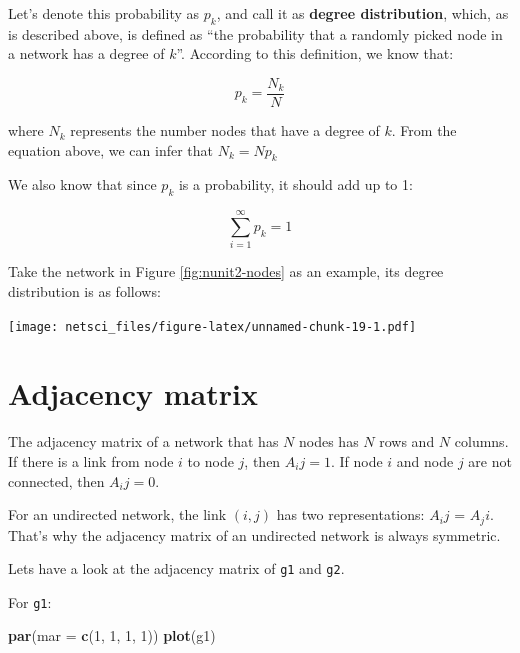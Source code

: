 \documentclass[
]{krantz}
\makeatletter
\newenvironment{Shaded}{\begin{snugshade}}{\end{snugshade}}
\newcommand{\DataTypeTok}[1]{\textcolor[rgb]{0.27,0.27,0.27}{#1}}
\newcommand{\DecValTok}[1]{\textcolor[rgb]{0.06,0.06,0.06}{#1}}
\newcommand{\KeywordTok}[1]{\textcolor[rgb]{0.27,0.27,0.27}{\textbf{#1}}}
\newcommand{\NormalTok}[1]{#1}
\newenvironment{kframe}{%
\medskip{}
\setlength{\fboxsep}{.8em}
 \def\at@end@of@kframe{}%
 \ifinner\ifhmode%
  \def\at@end@of@kframe{\end{minipage}}%
  \begin{minipage}{\columnwidth}%
 \fi\fi%
 \def\FrameCommand##1{\hskip\@totalleftmargin \hskip-\fboxsep
 \colorbox{shadecolor}{##1}\hskip-\fboxsep
     \hskip-\linewidth \hskip-\@totalleftmargin \hskip\columnwidth}%
 \MakeFramed {\advance\hsize-\width
   \@totalleftmargin\z@ \linewidth\hsize
   \@setminipage}}%
 {\par\unskip\endMakeFramed%
 \at@end@of@kframe}
\renewenvironment{Shaded}{\begin{kframe}}{\end{kframe}}
\makeatother
\begin{document}
Let's denote this probability as \(p_k\), and call it as \textbf{degree distribution}, which, as is described above, is defined as ``the probability that a randomly picked node in a network has a degree of \(k\)''. According to this definition, we know that:

\begin{equation}
  p_k = \frac{N_k}{N} \label{eq:degree-distribution}
\end{equation}

where \(N_k\) represents the number nodes that have a degree of \(k\). From the equation above, we can infer that \(N_k = Np_k\)

We also know that since \(p_k\) is a probability, it should add up to 1:

\begin{equation}
  \sum_{i=1}^\infty p_k = 1 \label{eq:pk-sum}
\end{equation}

Take the network in Figure \ref{fig:nunit2-nodes} as an example, its degree distribution is as follows:

\texttt{[image: netsci\_files/figure-latex/unnamed-chunk-19-1.pdf]}

\hypertarget{adjacency-matrix}{%
\section{Adjacency matrix}\label{adjacency-matrix}}

The adjacency matrix of a network that has \(N\) nodes has \(N\) rows and \(N\) columns. If there is a link from node \(i\) to node \(j\), then \(A_ij = 1\). If node \(i\) and node \(j\) are not connected, then \(A_ij = 0\).

For an undirected network, the link \((i, j)\) has two representations: \(A_ij\) = \(A_ji\). That's why the adjacency matrix of an undirected network is always symmetric.

Lets have a look at the adjacency matrix of \texttt{g1} and \texttt{g2}.

For \texttt{g1}:

\begin{Shaded}
\begin{Highlighting}[]
\KeywordTok{par}\NormalTok{(}\DataTypeTok{mar =} \KeywordTok{c}\NormalTok{(}\DecValTok{1}\NormalTok{, }\DecValTok{1}\NormalTok{, }\DecValTok{1}\NormalTok{, }\DecValTok{1}\NormalTok{))}
\KeywordTok{plot}\NormalTok{(g1)}
\end{Highlighting}
\end{Shaded}
\end{document}

